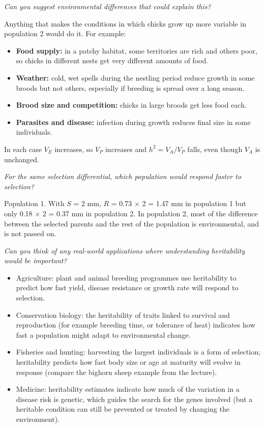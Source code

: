 \documentclass[
  a4paper]{book}
\providecommand{\tightlist}{%
  \setlength{\itemsep}{0pt}\setlength{\parskip}{0pt}}
\begin{document}
\emph{Can you suggest environmental differences that could explain this?}

Anything that makes the conditions in which chicks grow up more variable in population 2 would do it. For example:

\begin{itemize}
\tightlist
\item
  \textbf{Food supply:} in a patchy habitat, some territories are rich and others poor, so chicks in different nests get very different amounts of food.
\item
  \textbf{Weather:} cold, wet spells during the nestling period reduce growth in some broods but not others, especially if breeding is spread over a long season.
\item
  \textbf{Brood size and competition:} chicks in large broods get less food each.
\item
  \textbf{Parasites and disease:} infection during growth reduces final size in some individuals.
\end{itemize}

In each case \(V_E\) increases, so \(V_P\) increases and \(h^2 = V_A/V_P\) falls, even though \(V_A\) is unchanged.

\emph{For the same selection differential, which population would respond faster to selection?}

Population 1. With \(S\) = 2 mm, \(R\) = 0.73 × 2 = 1.47 mm in population 1 but only 0.18 × 2 = 0.37 mm in population 2. In population 2, most of the difference between the selected parents and the rest of the population is environmental, and is not passed on.

\emph{Can you think of any real-world applications where understanding heritability would be important?}

\begin{itemize}
\tightlist
\item
  Agriculture: plant and animal breeding programmes use heritability to predict how fast yield, disease resistance or growth rate will respond to selection.
\item
  Conservation biology: the heritability of traits linked to survival and reproduction (for example breeding time, or tolerance of heat) indicates how fast a population might adapt to environmental change.
\item
  Fisheries and hunting: harvesting the largest individuals is a form of selection; heritability predicts how fast body size or age at maturity will evolve in response (compare the bighorn sheep example from the lecture).
\item
  Medicine: heritability estimates indicate how much of the variation in a disease risk is genetic, which guides the search for the genes involved (but a heritable condition can still be prevented or treated by changing the environment).
\end{itemize}
\end{document}

